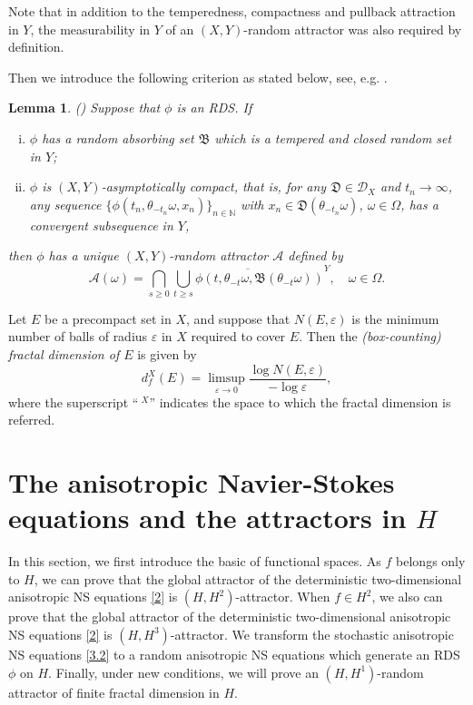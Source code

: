 \documentclass{elsarticle}
\newtheorem{lemma}[theorem]{Lemma}
\theoremstyle{definition}
\numberwithin{equation}{section}
\newcommand{\N}{\mathbb{N}}
\newcommand{\D}{\mathcal{D}}
\newcommand{\A}{\mathcal{A}}
\begin{document}
Note that  in addition to the temperedness, compactness and pullback attraction in $Y$,  the measurability in $Y$ of an $(X,Y)$-random attractor was also  required by definition.

 Then we introduce  the following criterion  as  stated below, see, e.g. \cite[Theorem 19]{cui18jdde}.
  \begin{lemma}(\cite[Theorem 19]{cui18jdde}) \label{lem:cui18}
 Suppose that $\phi$ is  an RDS.  If
  \begin{enumerate}[(i)]
  \item  $\phi$ has a   random absorbing set $\mathfrak B$ which is a tempered and closed random set in $Y$;
  \item $\phi$  is $(X,Y)$-asymptotically compact, that is, for any $ \mathfrak D\in \D_X$ and $t_n\to \infty$,   any sequence
  $\{\phi(t_n, \theta_{-t_n} \omega, x_n)\}_{n\in \N}$ with $x_n \in \mathfrak D(\theta_{-t_n} \omega)$, $\omega\in \Omega$, has a convergent subsequence in $Y$,
  \end{enumerate}
    then  $\phi$ has a unique   $(X,Y)$-random attractor $\A$ defined by
    \[
    \A(\omega) = \bigcap_{s\geq 0} \overline{ \bigcup_{t\geq  s} \phi(t,\theta_{-t} \omega, \mathfrak  B(\theta_{-t}\omega)) }^Y ,
    \quad \omega \in \Omega.
    \]
  \end{lemma}


 \medskip

 Let $E$ be a precompact  set in $X$, and suppose that $N(E, \varepsilon)$ is the minimum number of balls of radius $\varepsilon$ in $X$ required to cover $E$. Then the {\emph{(box-counting) fractal dimension of $E$}}  is given by
\[
 d_f^X(E)=\limsup_{\varepsilon\to 0} \frac{ \log N(E,\varepsilon)}{ -\log \varepsilon} ,
\]
where the superscript ``$\ ^X$''   indicates the space to which  the fractal dimension is referred.








\section{The anisotropic Navier-Stokes equations and the   attractors in $H$}\label{sec3}
In this section, we first introduce the basic of functional spaces. As $f$ belongs only to $H$, we can prove that the global attractor of the deterministic two-dimensional anisotropic  NS equations \eqref{2} is $(H,H^2)$-attractor. When $f\in H^2$, we also can prove that the global attractor of the deterministic two-dimensional anisotropic  NS equations \eqref{2} is $(H,H^3)$-attractor. We transform the stochastic anisotropic  NS equations \eqref{3.2} to a random  anisotropic  NS equations  which generate an RDS $\phi$ on $H$. Finally, under  new   conditions, we will prove an $(H,H^1)$-random attractor of finite  fractal dimension in $H$.
\end{document}
